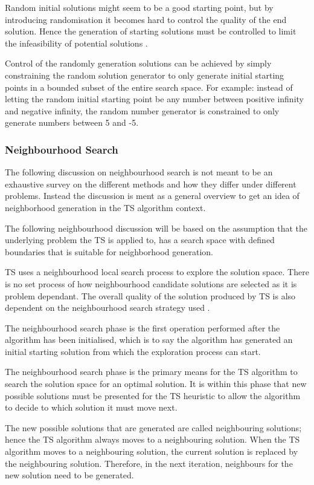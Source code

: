 Random initial solutions might seem to be a good starting point, but by introducing randomisation it becomes hard to control the quality of the end solution\cite{TSHazardous}. Hence the generation of starting solutions must be controlled to limit the infeasibility of potential solutions \cite{TSHazardous}. 

Control of the randomly generation solutions can be achieved by simply constraining the random solution generator to only generate initial starting points in a bounded subset of the entire search space. For example: instead of letting the random initial starting point be any number between positive infinity and negative infinity, the random number generator is constrained to only generate numbers between 5 and -5.

\subsubsection{Neighbourhood Search}
The following discussion on neighbourhood search is not meant to be an exhaustive survey on the different methods and how they differ under different problems. Instead the discussion is ment as a general overview to get an idea of neighborhood generation in the TS algorithm context. 

The following neighbourhood discussion will be based on the assumption that the underlying problem the TS is applied to, has a search space with defined boundaries that is suitable for neighborhood generation.

TS uses a neighbourhood local search process to explore the solution space. There is no set process of how neighbourhood candidate solutions are selected as it is problem dependant. The overall quality of the solution produced by TS is also dependent on the neighbourhood search strategy used \cite{TSHazardous}. 

The neighbourhood search phase is the first operation performed after the algorithm has been initialised, which is to say the algorithm has generated an initial starting solution from which the exploration process can start.

The neighbourhood search phase is the primary means for the TS algorithm to search the solution space for an optimal solution. It is within this phase that new possible solutions must be presented for the TS heuristic to allow the algorithm to decide to which solution it must move next.

The new possible solutions that are generated are called neighbouring solutions; hence the TS algorithm always moves to a neighbouring solution. When the TS algorithm moves to a neighbouring solution, the current solution is replaced by the neighbouring solution. Therefore, in the next iteration, neighbours for the new solution need to be generated.

